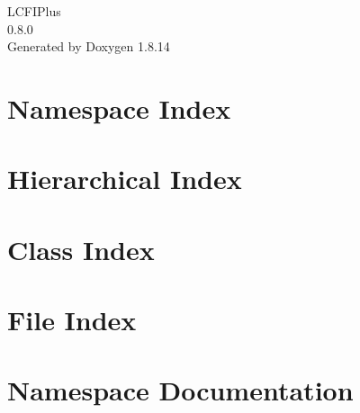 \documentclass[twoside]{book}
\newcommand{\+}{\discretionary{\mbox{\scriptsize$\hookleftarrow$}}{}{}}
\newcommand{\clearemptydoublepage}{%
  \newpage{\pagestyle{empty}\cleardoublepage}%
}
\begin{document}
\begin{titlepage}
\vspace*{7cm}
\begin{center}%
{\Large L\+C\+F\+I\+Plus \\[1ex]\large 0.\+8.\+0 }\\
\vspace*{1cm}
{\large Generated by Doxygen 1.8.14}\\
\end{center}
\end{titlepage}
\clearemptydoublepage
{}
\tableofcontents
\clearemptydoublepage
{}

\chapter{Namespace Index}

\chapter{Hierarchical Index}

\chapter{Class Index}

\chapter{File Index}

\chapter{Namespace Documentation}







\end{document}
